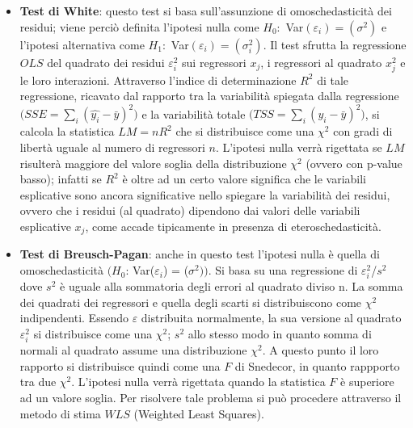 \documentclass[a4page, 11pt]{article} %
\begin{document}
\begin{itemize}
\item \textbf{Test di White}: questo test si basa sull’assunzione di omoschedasticità dei residui; viene perciò definita l’ipotesi nulla come $H_0:$ Var$(\varepsilon_i) = (\sigma^2)$ e l’ipotesi alternativa come $H_1:$ Var$(\varepsilon_i ) = ( \sigma^2_i )$.
Il test sfrutta la regressione $OLS$ del quadrato dei residui $\varepsilon_i^2$ sui regressori $x_j$, i regressori al quadrato $x_j^2$ e le loro interazioni.
Attraverso l'indice di determinazione $R^{2}$ di tale regressione, ricavato dal rapporto tra la variabilità spiegata dalla regressione $\bigl(SSE = \sum_{i}(\hat{y_i} - \bar{y})^2\bigr)$ e la variabilità totale $\bigl(TSS = \sum_{i} (y_i - \bar{y})^2\bigr)$, si calcola la statistica $LM=n R^{2}$ che si distribuisce come una $\chi^{2}$ con gradi di libertà uguale al numero di regressori $n$. L’ipotesi nulla verrà rigettata se $LM$ risulterà maggiore del valore soglia della distribuzione $\chi^{2}$ (ovvero con p-value basso); %
infatti se $R^{2}$ è oltre ad un certo valore significa che le variabili esplicative sono ancora significative nello spiegare la variabilità dei residui, ovvero che i residui (al quadrato) dipendono dai valori delle variabili esplicative $x_j$, come accade tipicamente in presenza di eteroschedasticità.

\item \textbf{Test di Breusch-Pagan}: anche in questo test l’ipotesi nulla è quella di omoschedasticità $\bigl(H_0$: Var($\varepsilon_i$) = ($\sigma^2)\bigr)$.
Si basa su una regressione di $\varepsilon^{2}_i$/$s^{2}$ dove $s^{2}$ è uguale alla sommatoria degli errori al quadrato diviso n. La somma dei quadrati dei regressori e quella degli scarti si distribuiscono come $\chi^{2}$ indipendenti. Essendo $\varepsilon$ distribuita normalmente, la sua versione al quadrato $\varepsilon_i^2$ si distribuisce come una $\chi^2$; $s^2$ allo stesso modo in quanto somma di normali al quadrato assume una distribuzione $\chi^2$. A questo punto il loro rapporto si distribuisce quindi come una $F$ di Snedecor, in quanto rappporto tra due $\chi^2$. L’ipotesi nulla verrà rigettata quando la statistica $F$ è superiore ad un valore soglia.
Per risolvere tale problema si può procedere attraverso il metodo di stima $WLS$ (Weighted Least Squares).
\end{itemize}
\end{document}

